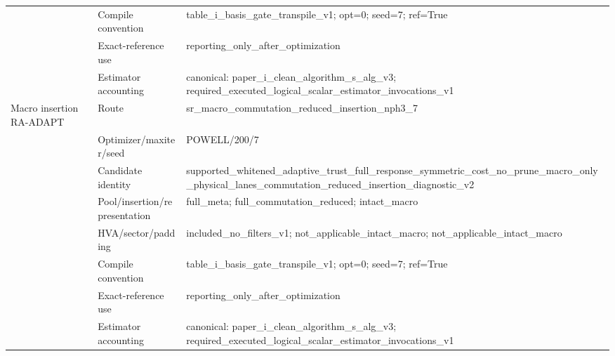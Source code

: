 \documentclass[10pt,letterpaper]{article}
\begin{document}
\begin{longtable}{@{}>{\raggedright\arraybackslash}p{0.9in}>{\raggedright\arraybackslash}p{1.65in}>{\raggedright\arraybackslash}p{4.7in}@{}}
 & Compile convention & table\_\allowbreak{}i\_\allowbreak{}basis\_\allowbreak{}gate\_\allowbreak{}transpile\_\allowbreak{}v1;\allowbreak{} opt=0;\allowbreak{} seed=7;\allowbreak{} ref=True \\
 & Exact-reference use & reporting\_\allowbreak{}only\_\allowbreak{}after\_\allowbreak{}optimization \\
 & Estimator accounting & canonical:\allowbreak{} paper\_\allowbreak{}i\_\allowbreak{}clean\_\allowbreak{}algorithm\_\allowbreak{}s\_\allowbreak{}alg\_\allowbreak{}v3;\allowbreak{} required\_\allowbreak{}executed\_\allowbreak{}logical\_\allowbreak{}scalar\_\allowbreak{}estimator\_\allowbreak{}invocations\_\allowbreak{}v1 \\
\addlinespace[2pt]
Macro insertion RA-ADAPT & Route & sr\_\allowbreak{}macro\_\allowbreak{}commutation\_\allowbreak{}reduced\_\allowbreak{}insertion\_\allowbreak{}nph3\_\allowbreak{}7 \\
 & Optimizer/maxiter/seed & POWELL/\allowbreak{}200/\allowbreak{}7 \\
 & Candidate identity & supported\_\allowbreak{}whitened\_\allowbreak{}adaptive\_\allowbreak{}trust\_\allowbreak{}full\_\allowbreak{}response\_\allowbreak{}symmetric\_\allowbreak{}cost\_\allowbreak{}no\_\allowbreak{}prune\_\allowbreak{}macro\_\allowbreak{}only\_\allowbreak{}physical\_\allowbreak{}lanes\_\allowbreak{}commutation\_\allowbreak{}reduced\_\allowbreak{}insertion\_\allowbreak{}diagnostic\_\allowbreak{}v2 \\
 & Pool/insertion/representation & full\_\allowbreak{}meta;\allowbreak{} full\_\allowbreak{}commutation\_\allowbreak{}reduced;\allowbreak{} intact\_\allowbreak{}macro \\
 & HVA/sector/padding & included\_\allowbreak{}no\_\allowbreak{}filters\_\allowbreak{}v1;\allowbreak{} not\_\allowbreak{}applicable\_\allowbreak{}intact\_\allowbreak{}macro;\allowbreak{} not\_\allowbreak{}applicable\_\allowbreak{}intact\_\allowbreak{}macro \\
 & Compile convention & table\_\allowbreak{}i\_\allowbreak{}basis\_\allowbreak{}gate\_\allowbreak{}transpile\_\allowbreak{}v1;\allowbreak{} opt=0;\allowbreak{} seed=7;\allowbreak{} ref=True \\
 & Exact-reference use & reporting\_\allowbreak{}only\_\allowbreak{}after\_\allowbreak{}optimization \\
 & Estimator accounting & canonical:\allowbreak{} paper\_\allowbreak{}i\_\allowbreak{}clean\_\allowbreak{}algorithm\_\allowbreak{}s\_\allowbreak{}alg\_\allowbreak{}v3;\allowbreak{} required\_\allowbreak{}executed\_\allowbreak{}logical\_\allowbreak{}scalar\_\allowbreak{}estimator\_\allowbreak{}invocations\_\allowbreak{}v1 \\

\end{longtable}
\end{document}
